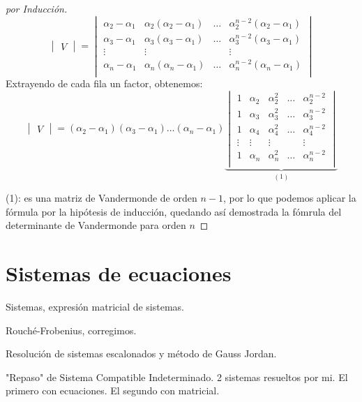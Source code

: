 \begin{proof}[por Inducción]
\[\begin{vmatrix} V \end{vmatrix}=\begin{vmatrix}
\alpha_2-\alpha_1 & \alpha_2(\alpha_2-\alpha_1) & \dots & \alpha_2^{n-2}(\alpha_2-\alpha_1)\\
\alpha_3-\alpha_1 & \alpha_3(\alpha_3-\alpha_1) & \dots & \alpha_3^{n-2}(\alpha_3-\alpha_1)\\
\vdots & \vdots & &\vdots \\
\alpha_n-\alpha_1 & \alpha_n(\alpha_n-\alpha_1) & \dots & \alpha_n^{n-2}(\alpha_n-\alpha_1)\\
\end{vmatrix}\]
Extrayendo de cada fila un factor, obtenemos:
\[\begin{vmatrix} V \end{vmatrix}=
(\alpha_2-\alpha_1)(\alpha_3-\alpha_1)\dots(\alpha_n-\alpha_1)
\underbrace{\begin{vmatrix}
1 & \alpha_2 & \alpha_2^2 & \dots & \alpha_2^{n-2}\\
1 & \alpha_3 & \alpha_3^2 & \dots & \alpha_3^{n-2}\\
1 & \alpha_4 & \alpha_4^2 & \dots & \alpha_4^{n-2}\\
\vdots & \vdots & \vdots & &\vdots \\
1 & \alpha_n & \alpha_n^2 & \dots & \alpha_n^{n-2}\\
\end{vmatrix}}_{(1)}\]

(1): es una matriz de Vandermonde de orden $n-1$, por lo que podemos aplicar la fórmula por la hipótesis de inducción, quedando así demostrada la fómrula del determinante de Vandermonde para orden $n$
\end{proof}

\section{Sistemas de ecuaciones}

Sistemas, expresión matricial de sistemas. 
 
Rouché-Frobenius, corregimos. 

Resolución de sistemas escalonados y método de Gauss Jordan.
 
"Repaso" de Sistema Compatible Indeterminado. 2 sistemas resueltos por mi. El primero con ecuaciones. El segundo con matricial.


